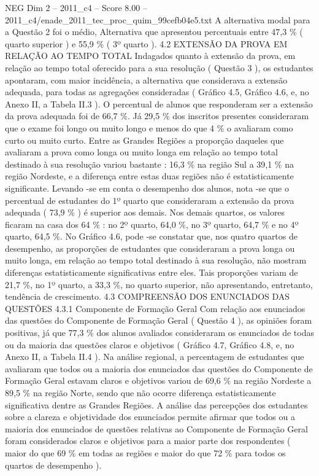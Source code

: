 \begin{textsample}{NEG Dim 2 – 2011\_c4 – Score 8.00 – 2011\_c4/enade\_2011\_tec\_proc\_quim\_99cefb04e5.txt}
A alternativa modal para a Questão 2 foi o médio, Alternativa que apresentou percentuais entre 47,3 \% ( quarto superior ) e 55,9 \% ( 3º quarto ). 4.2 EXTENSÃO DA PROVA EM RELAÇÃO AO TEMPO TOTAL Indagados quanto à extensão da prova, em relação ao tempo total oferecido para a sua resolução ( Questão 3 ), os estudantes apontaram, com maior incidência, a alternativa que considerava a extensão adequada, para todas as agregações consideradas ( Gráfico 4.5, Gráfico 4.6, e, no Anexo II, a Tabela II.3 ).
O percentual de alunos que responderam ser a extensão da prova adequada foi de 66,7 \%.
Já 29,5 \% dos inscritos presentes consideraram que o exame foi longo ou muito longo e menos do que 4 \% o avaliaram como curto ou muito curto.
Entre as Grandes Regiões a proporção daqueles que avaliaram a prova como longa ou muito longa em relação ao tempo total destinado à sua resolução variou bastante : 16,3 \% na região Sul a 39,1 \% na região Nordeste, e a diferença entre estas duas regiões não é estatisticamente significante.
Levando -se em conta o desempenho dos alunos, nota -se que o percentual de estudantes do 1º quarto que consideraram a extensão da prova adequada ( 73,9 \% ) é superior aos demais.
Nos demais quartos, os valores ficaram na casa dos 64 \% : no 2º quarto, 64,0 \%, no 3º quarto, 64,7 \% e no 4º quarto, 64,5 \%.
No Gráfico 4.6, pode -se constatar que, nos quatro quartos de desempenho, as proporções de estudantes que consideraram a prova longa ou muito longa, em relação ao tempo total destinado à sua resolução, não mostram diferenças estatisticamente significativas entre eles.
Tais proporções variam de 21,7 \%, no 1º quarto, a 33,3 \%, no quarto superior, não apresentando, entretanto, tendência de crescimento. 4.3 COMPREENSÃO DOS ENUNCIADOS DAS QUESTÕES 4.3.1 Componente de Formação Geral Com relação aos enunciados das questões do Componente de Formação Geral ( Questão 4 ), as opiniões foram positivas, já que 77,3 \% dos alunos avaliados consideraram os enunciados de todas ou da maioria das questões claros e objetivos ( Gráfico 4.7, Gráfico 4.8, e, no Anexo II, a Tabela II.4 ).
Na análise regional, a percentagem de estudantes que avaliaram que todos ou a maioria dos enunciados das questões do Componente de Formação Geral estavam claros e objetivos variou de 69,6 \% na região Nordeste a 89,5 \% na região Norte, sendo que não ocorre diferença estatisticamente significativa dentre as Grandes Regiões.
A análise das percepções dos estudantes sobre a clareza e objetividade dos enunciados permite afirmar que todos ou a maioria dos enunciados de questões relativas ao Componente de Formação Geral foram considerados claros e objetivos para a maior parte dos respondentes ( maior do que 69 \% em todas as regiões e maior do que 72 \% para todos os quartos de desempenho ).

\end{textsample}
